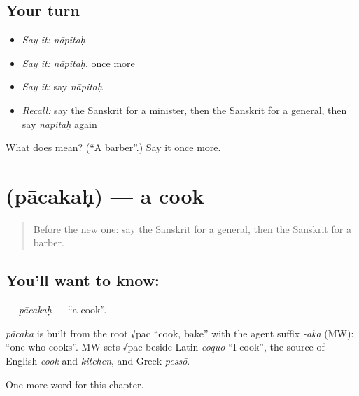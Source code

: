 \subsection*{Your turn}
\begin{itemize}
\raggedright
  \item \emph{Say it:} \emph{nāpitaḥ}
  \item \emph{Say it:} \emph{nāpitaḥ}, once more
  \item \emph{Say it:} say \emph{nāpitaḥ}
  \item \emph{Recall:} say the Sanskrit for a minister, then the Sanskrit for a general, then say \emph{nāpitaḥ} again
\end{itemize}

\begin{tcolorbox}[breakable,colback=teal!4,colframe=teal!35!black,title={Before you move on}]
What does  mean? (\textquotedblleft{}A barber\textquotedblright{}.) Say it once more.
\end{tcolorbox}
\section[\texorpdfstring{\sk{पाचकः} (pācakaḥ)}{पाचकः (pācakaḥ)}]{ (pācakaḥ) — a cook}

\label{lesson:SA-C148-pacakah}



\begin{quote}
Before the new one: say the Sanskrit for a general, then the Sanskrit for a barber.
\end{quote}

\subsection*{You'll want to know: }
\textbf{} — \emph{pācakaḥ} — \textquotedblleft{}a cook\textquotedblright{}.

\begin{cousinweb}
\emph{pācaka} is built from the root √pac \textquotedblleft{}cook, bake\textquotedblright{} with the agent suffix \emph{-aka} (MW): \textquotedblleft{}one who cooks\textquotedblright{}. MW sets √pac beside Latin \emph{coquo} \textquotedblleft{}I cook\textquotedblright{}, the source of English \emph{cook} and \emph{kitchen}, and Greek \emph{pessō}.
\end{cousinweb}

\begin{grammarlens}[title={What you've built}]
One more word for this chapter.
\end{grammarlens}

